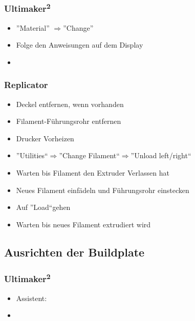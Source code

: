 \documentclass{\basedir/fablab-document}
\newcommand{\ts}[1]{\textsuperscript{#1}}
\newcommand{\ra}{$\Rightarrow$}
\begin{document}
\subsubsection{Ultimaker\ts2}
\begin{itemize}
    \item ''Material'' \ra ''Change''
    \item Folge den Anweisungen auf dem Display
    \item {}
\end{itemize}

\subsubsection{Replicator}
\begin{itemize}
	\item Deckel entfernen, wenn vorhanden
	\item Filament-Führungsrohr entfernen
	\item Drucker Vorheizen
	\item ''Utilities``\ra ''Change Filament``\ra ''Unload left/right``
	\item Warten bis Filament den Extruder Verlassen hat 
	\item Neues Filament einfädeln und Führungsrohr einstecken
	\item Auf ''Load``gehen
	\item Warten bis neues Filament extrudiert wird
\end{itemize}

\subsection{Ausrichten der Buildplate}

\subsubsection{Ultimaker\ts2}
\begin{itemize}
\item Assistent:
\item {}
\end{itemize}
\end{document}
